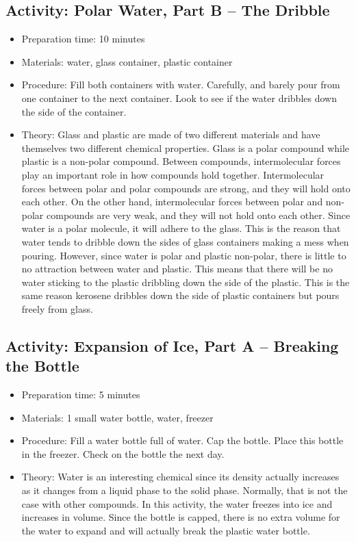 \begin{itemize}
{\begin{itemize}
\begin{itemize}
{\subsection{Activity: Polar Water, Part B – The Dribble}
\begin{itemize}
\item{Preparation time: 10 minutes}
\item{Materials: water, glass container, plastic container}
\item{Procedure: Fill both containers with water. Carefully, and barely pour from one container to the next container. Look to see if the water dribbles down the side of the container.}
\item{Theory: Glass and plastic are made of two different materials and have themselves two different chemical properties. Glass is a polar compound while plastic is a non-polar compound. Between compounds, intermolecular forces play an important role in how compounds hold together. Intermolecular forces between polar and polar compounds are strong, and they will hold onto each other. On the other hand, intermolecular forces between polar and non-polar compounds are very weak, and they will not hold onto each other. Since water is a polar molecule, it will adhere to the glass. This is the reason that water tends to dribble down the sides of glass containers making a mess when pouring. However, since water is polar and plastic non-polar, there is little to no attraction between water and plastic. This means that there will be no water sticking to the plastic dribbling down the side of the plastic. This is the same reason kerosene dribbles down the side of plastic containers but pours freely from glass.}
\end{itemize}

\subsection{Activity: Expansion of Ice, Part A – Breaking the Bottle}
\begin{itemize}
\item{Preparation time: 5 minutes}
\item{Materials: 1 small water bottle, water, freezer}
\item{Procedure: Fill a water bottle full of water. Cap the bottle. Place this bottle in the freezer. Check on the bottle the next day.}
\item{Theory: Water is an interesting chemical since its density actually increases as it changes from a liquid phase to the solid phase. Normally, that is not the case with other compounds. In this activity, the water freezes into ice and increases in volume. Since the bottle is capped, there is no extra volume for the water to expand and will actually break the plastic water bottle. }
\end{itemize}

}
\end{itemize}
\end{itemize}}
\end{itemize}

